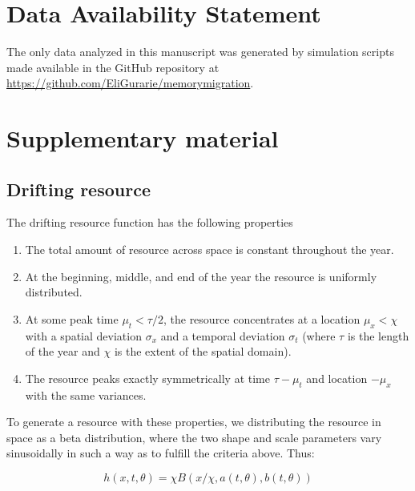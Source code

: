 \documentclass[utf8]{frontiersSCNS} %
\begin{document}
\section*{Data Availability Statement}

The only data analyzed in this manuscript was generated by simulation scripts made available in the GitHub repository at \url{https://github.com/EliGurarie/memorymigration}. 



\clearpage
\appendix

\section{Supplementary material}
\normalsize

\subsection{Drifting resource}
The drifting resource function has the following properties

\begin{enumerate}
	\item The total amount of resource across space is constant throughout the year.
	\item At the beginning, middle, and end of the year the resource is uniformly distributed. 
	\item At some peak time $\mu_t < \tau/2$, the resource concentrates at a location $\mu_x < \chi$ with a spatial deviation $\sigma_x$ and a temporal deviation $\sigma_t$ (where $\tau$ is the length of the year and $\chi$ is the extent of the spatial domain).
	\item The resource peaks exactly symmetrically at time $\tau - \mu_t$ and location $-\mu_x$ with the same variances.
\end{enumerate}

To generate a resource with these properties, we distributing the resource in space as a beta distribution, where the two shape and scale parameters vary sinusoidally in such a way as to fulfill the criteria above.  Thus:

$$h(x,t, \theta) = \chi B(x/\chi, a(t, \theta), b(t, \theta))$$
\end{document}
